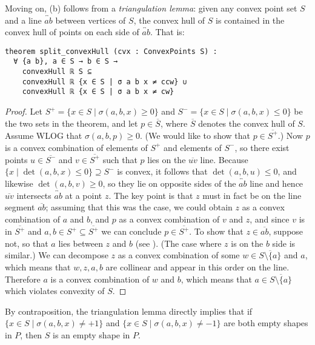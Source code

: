 Moving on, (b) follows from a \emph{triangulation lemma}:
given any convex point set $S$
and a line $\overleftrightarrow{ab}$ between vertices of $S$,
the convex hull of $S$ is contained in the convex hull
of points on each side of $\overleftrightarrow{ab}$.
That is:
\begin{lstlisting}
theorem split_convexHull (cvx : ConvexPoints S) :
  ∀ {a b}, a ∈ S → b ∈ S →
    convexHull ℝ S ⊆
    convexHull ℝ {x ∈ S | σ a b x ≠ ccw} ∪
    convexHull ℝ {x ∈ S | σ a b x ≠ cw}
\end{lstlisting}

\begin{proof}
    Let $S^+=\{x\in S\mid \sigma(a,b,x)\ge 0\}$ and $S^-=\{x\in S\mid \sigma(a,b,x)\le 0\}$ be the two sets in the theorem, and let $p\in \overline{S}$, where $\overline{S}$ denotes the convex hull of $S$. Assume WLOG that $\sigma(a,b,p)\ge 0$. (We would like to show that $p\in \overline{S^+}$.) Now $p$ is a convex combination of elements of $S^+$ and elements of $S^-$, so there exist points $u\in \overline{S^-}$ and $v\in \overline{S^+}$ such that $p$ lies on the $\overline{uv}$ line.
% 
    Because $\{x\mid \det(a,b,x)\le 0\}\supseteq S^-$ is convex, it follows that $\det(a,b,u)\le 0$, and likewise $\det(a,b,v)\ge 0$, so they lie on opposite sides of the $\overleftrightarrow{ab}$ line and hence $\overline{uv}$ intersects $\overleftrightarrow{ab}$ at a point $z$. The key point is that $z$ must in fact be on the line segment $\overline{ab}$; assuming that this was the case, we could obtain $z$ as a convex combination of $a$ and $b$, and $p$ as a convex combination of $v$ and $z$, and since $v$ is in $\overline{S^+}$ and $a,b\in S^+\subseteq\overline{S^+}$ we can conclude $p\in \overline{S^+}$.
% 
    To show that $z\in \overline{ab}$, suppose not, so that $a$ lies between $z$ and $b$ (see ). (The case where $z$ is on the $b$ side is similar.) We can decompose $z$ as a convex combination of some $w\in \overline{S\setminus\{a\}}$ and $a$, which means that $w,z,a,b$ are collinear and appear in this order on the line. Therefore $a$ is a convex combination of $w$ and $b$, which means that $a\in \overline{S\setminus\{a\}}$ which violates convexity of $S$.
\end{proof}

By contraposition,
the triangulation lemma directly implies that
if $\{x \in S \mid \sigma(a,b,x) \neq +1\}$ and $\{x \in S \mid \sigma(a,b,x) \neq -1\}$
are both empty shapes in $P$,
then $S$ is an empty shape in $P$.

